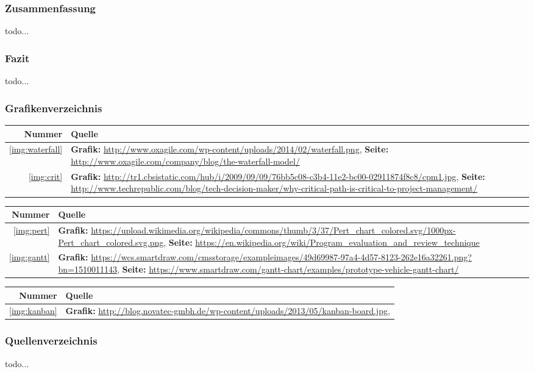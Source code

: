 \documentclass[%
	handout
]{beamer}
\begin{document}
\section{}
	\subsection{}
		\begin{frame}
			\frametitle{Zusammenfassung}
			todo...
		\end{frame}
		\begin{frame}
			\frametitle{Fazit}
			todo...
		\end{frame}
		\begin{frame}
			\frametitle{Grafikenverzeichnis}
			\begin{tabular}{r|p{}}
				\textbf{Nummer}		&	\textbf{Quelle}	\\ \hline
		
				\ref{img:waterfall}	&	\textbf{Grafik:} \url{http://www.oxagile.com/wp-content/uploads/2014/02/waterfall.png},
										\textbf{Seite:} \url{http://www.oxagile.com/company/blog/the-waterfall-model/}	\\\hline
				\ref{img:crit}		&	\textbf{Grafik:} \url{http://tr1.cbsistatic.com/hub/i/2009/09/09/76bb5c08-c3b4-11e2-bc00-02911874f8c8/cpm1.jpg},
										\textbf{Seite:} \url{http://www.techrepublic.com/blog/tech-decision-maker/why-critical-path-is-critical-to-project-management/}
			\end{tabular}
		\end{frame}
		\begin{frame}
			\begin{tabular}{r|p{.85\textwidth}}
				\textbf{Nummer}		&	\textbf{Quelle}	\\ \hline
				\ref{img:pert}		&	\textbf{Grafik:} \url{https://upload.wikimedia.org/wikipedia/commons/thumb/3/37/Pert_chart_colored.svg/1000px-Pert_chart_colored.svg.png},
										\textbf{Seite:}	 \url{https://en.wikipedia.org/wiki/Program_evaluation_and_review_technique}\\\hline
				\ref{img:gantt}		&	\textbf{Grafik:} \url{https://wcs.smartdraw.com/cmsstorage/exampleimages/49d69987-97a4-4d57-8123-262e16a32261.png?bn=1510011143},
										\textbf{Seite:} \url{https://www.smartdraw.com/gantt-chart/examples/prototype-vehicle-gantt-chart/}
			\end{tabular}
		\end{frame}
		\begin{frame}
			\begin{tabular}{r|p{}}
				\textbf{Nummer}		&	\textbf{Quelle}	\\ \hline
				\ref{img:kanban}	&	\textbf{Grafik:} \url{http://blog.novatec-gmbh.de/wp-content/uploads/2013/05/kanban-board.jpg}, 
		
			\end{tabular}
		\end{frame}
		\begin{frame}
			\frametitle{Quellenverzeichnis}
			todo...
		\end{frame}
	
\end{document}
